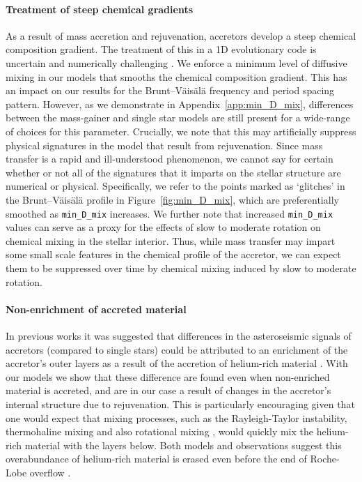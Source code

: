\documentclass[desactivate]{aa}
\newcommand{\referee}[1]{{\bf #1}}
\begin{document}
\paragraph{Treatment of steep chemical gradients} As a result of mass accretion and rejuvenation, accretors develop a steep chemical composition gradient. The treatment of this in a 1D evolutionary code is uncertain and numerically challenging \citep[e.g.\ ][]{Lau+2014:2014A&A...570A.125L}. We enforce a minimum level of diffusive mixing in our models that smooths the chemical composition gradient. This has an impact on our results for the Brunt–Väisälä frequency and period spacing pattern. However, as we demonstrate in Appendix~\ref{app:min_D_mix}, differences between the mass-gainer and single star models are still present for a wide-range of choices for this parameter. Crucially, we note that this may artificially suppress physical signatures in the model that result from rejuvenation. Since mass transfer is a rapid and ill-understood phenomenon, we cannot say for certain whether or not all of the signatures that it imparts on the stellar structure are numerical or physical. Specifically, we refer to the points marked as `glitches' in the Brunt–Väisälä profile in Figure~\ref{fig:min_D_mix}, which are preferentially smoothed as \texttt{min\_D\_mix} increases. We further note that increased \texttt{min\_D\_mix} values can serve as a proxy for the effects of slow to moderate rotation on chemical mixing in the stellar interior. Thus, while mass transfer may impart some small scale features in the chemical profile of the accretor, we can expect them to be suppressed over time by chemical mixing induced by slow to moderate rotation.

\referee{\paragraph{Non-enrichment of accreted material} In previous works it was suggested that differences in the asteroseismic signals of accretors (compared to single stars) could be attributed to an enrichment of the accretor's outer layers as a result of the accretion of helium-rich material \citep[e.g.][]{Miszuda+2021}. With our models we show that these difference are found even when non-enriched material is accreted, and are in our case a result of changes in the accretor's internal structure due to rejuvenation. This is particularly encouraging given that one would expect that mixing processes, such as the Rayleigh-Taylor instability, thermohaline mixing and also rotational mixing \citep{Kippenhahn+1980, Cantiello+2007}, would quickly mix the helium-rich material with the layers below. Both models and observations suggest this overabundance of helium-rich material is erased even before the end of Roche-Lobe overflow \citep{Renzo+2021}.}
\end{document}
